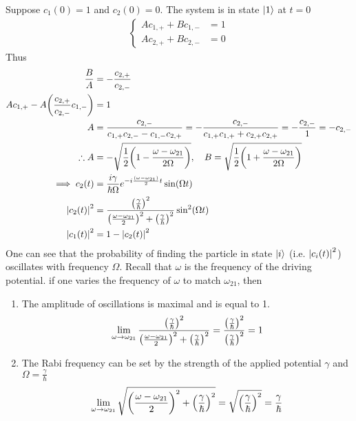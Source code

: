 \documentclass[12pt,a4paper,titlepage]{article}
\begin{document}
Suppose $c_{1}(0)=1$ and $c_{2}(0)=0$. The system is in state $\ket{1}$ at $t=0$
\begin{equation}
\begin{aligned}
\begin{cases}
Ac_{1,+}+Bc_{1,-} &=1\\
Ac_{2,+}+Bc_{2,-} &=0
\end{cases}
\end{aligned}
\end{equation}
Thus
\begin{equation}
\begin{aligned}
\frac{B}{A}&=-\frac{c_{2,+}}{c_{2,-}}\\
Ac_{1,+}-A\qty(\frac{c_{2,+}}{c_{2,-}}c_{1,-})&=1\\
A&=\frac{c_{2,-}}{c_{1,+}c_{2,-}-c_{1,-}c_{2,+}}=-\frac{c_{2,-}}{c_{1,+}c_{1,+}+c_{2,+}c_{2,+}}=-\frac{c_{2,-}}{1}=-c_{2,-}\\
\therefore A&=-\sqrt{\frac{1}{2}\qty(1-\frac{\omega-\omega_{21}}{2\Omega})},\quad B=\sqrt{\frac{1}{2}\qty(1+\frac{\omega-\omega_{21}}{2\Omega})}\\
\implies c_{2}(t)&=\frac{i\gamma}{\hbar\Omega}e^{-i\frac{(\omega-\omega_{21})}{2}t}\sin(\Omega t)\\
\abs{c_{2}(t)}^{2}&=\frac{\qty(\frac{\gamma}{\hbar})^{2}}{\qty(\frac{\omega-\omega_{21}}{2})^{2}+\qty(\frac{\gamma}{\hbar})^{2}}\sin^{2}(\Omega t)\\
\abs{c_{1}(t)}^{2}&=1-\abs{c_{2}(t)}^{2}
\end{aligned}
\end{equation}
One can see that the probability of finding the particle in state $\ket{i}$ (i.e. $\abs{c_{i}(t)}^{2}$) oscillates with frequency $\Omega$. Recall that $\omega$ is the frequency of the driving potential. if one varies the frequency of $\omega$ to match $\omega_{21}$, then
\begin{enumerate}
\item The amplitude of oscillations is maximal and is equal to 1.
\begin{equation}
\lim_{\omega\rightarrow\omega_{21}}\frac{\qty(\frac{\gamma}{\hbar})^{2}}{\qty(\frac{\omega-\omega_{21}}{2})^{2}+\qty(\frac{\gamma}{\hbar})^{2}}=\frac{\qty(\frac{\gamma}{\hbar})^{2}}{\qty(\frac{\gamma}{\hbar})^{2}}=1
\end{equation}
\item The Rabi frequency can be set by the strength of the applied potential $\gamma$ and $\Omega=\frac{\gamma}{\hbar}$
\begin{equation}
\lim_{\omega\rightarrow\omega_{21}}\sqrt{\qty(\frac{\omega-\omega_{21}}{2})^{2}+\qty(\frac{\gamma}{\hbar})^{2}}=\sqrt{\qty(\frac{\gamma}{\hbar})^{2}}=\frac{\gamma}{\hbar}
\end{equation}
\end{enumerate}
\end{document}
